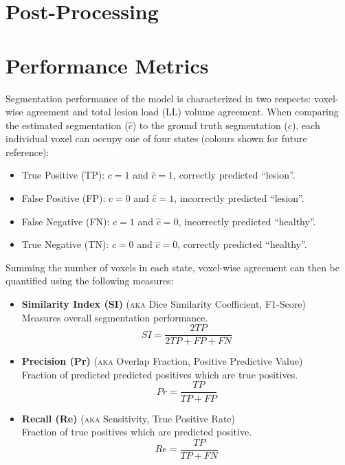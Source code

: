 \section{Post-Processing}

\clearpage
\section{Performance Metrics}
\label{ss:metrics}
Segmentation performance of the model is characterized in two respects: voxel-wise agreement and total lesion load (LL) volume agreement. 
When comparing the estimated segmentation ($\hat{c}$) to the ground truth segmentation ($c$), each individual voxel can occupy one of four states (colours shown for future reference):
\begin{itemize}[itemsep=0pt]
  \item[\textcolor{green}{\scalebox{0.7}{$\blacksquare$}}] True Positive (TP): $c = 1$ and $\hat{c} = 1$, correctly predicted ``lesion''.
  \item[\textcolor{red}  {\scalebox{0.7}{$\blacksquare$}}] False Positive (FP): $c = 0$ and $\hat{c} = 1$, incorrectly predicted ``lesion''.
  \item[\textcolor{blue} {\scalebox{0.7}{$\blacksquare$}}] False Negative (FN): $c = 1$ and $\hat{c} = 0$, incorrectly predicted ``healthy''.
  \item[\textcolor{black}{\scalebox{0.7}{$\blacksquare$}}] True Negative (TN): $c = 0$ and $\hat{c} = 0$, correctly predicted ``healthy''.
\end{itemize}
Summing the number of voxels in each state, voxel-wise agreement can then be quantified using the following measures:
\begin{itemize}
  \item \textbf{Similarity Index (SI)} (\textsc{aka} Dice Similarity Coefficient, F1-Score)\\Measures overall segmentation performance.
  \begin{equation}SI = \dfrac{2TP}{2TP + FP + FN}\end{equation}
  \item \textbf{Precision (Pr)} (\textsc{aka} Overlap Fraction, Positive Predictive Value)\\Fraction of predicted predicted positives which are true positives.
  \begin{equation}Pr = \dfrac{TP}{TP+FP}\end{equation}
  \item \textbf{Recall (Re)} (\textsc{aka} Sensitivity, True Positive Rate)\\Fraction of true positives which are predicted positive.
  \begin{equation}Re = \dfrac{TP}{TP+FN}\end{equation}
\end{itemize}
